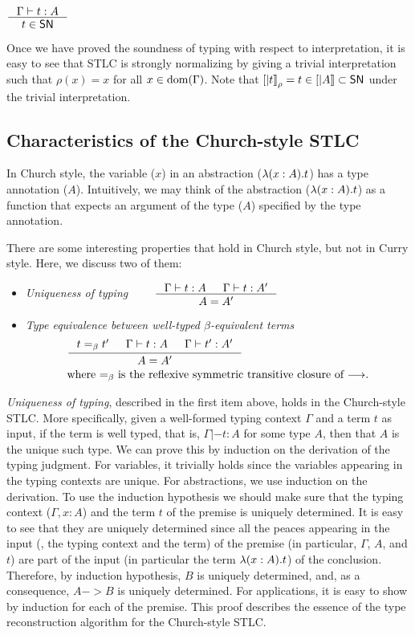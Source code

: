 \begin{corollary}
	$\inference{\Gamma |- t : A}{t \in \SN}$
\end{corollary}
Once we have proved the soundness of typing with respect to interpretation,
it is easy to see that STLC is strongly normalizing by giving a trivial
interpretation such that $\rho(x) = x$ for all $x\in\mathop{\mathrm{dom}}(\Gamma)$. Note that
$[|t|]_\rho = t \in [|A|] \subset \mathsf{SN}$ under the trivial interpretation.



\subsection{Characteristics of the Church-style STLC}\label{sec:stlc:church}
In Church style, the variable ($x$) in an abstraction
($\lambda(x:A).t$) has a type annotation ($A$). Intuitively, we may think of
the abstraction ($\lambda(x:A).t$) as a function that expects an argument of
the type ($A$) specified by the type annotation.

There are some interesting properties that hold in Church style,
but not in Curry style. Here, we discuss two of them:
\begin{itemize}
\item \emph{Uniqueness of typing}
$\qquad\inference{\Gamma |- t : A & \Gamma |- t : A'}{A = A'} $

\item \emph{Type equivalence between well-typed $\beta$-equivalent terms}
\begin{align*}
& \inference{t =_{\beta} t' & \Gamma |- t : A & \Gamma |- t' : A'}{A = A'} \\
& \text{where $=_{\beta}$ is the reflexive symmetric transitive closure of $-->$.}
\end{align*}
\end{itemize}

\emph{Uniqueness of typing}, described in the first item above,
holds in the Church-style STLC.  More specifically, given
a well-formed typing context $\Gamma$ and a term $t$ as input,
if the term is well typed, that is, $\Gamma |- t : A$ for some type $A$,
then that $A$ is the unique such type. We can prove this by induction on
the derivation of the typing judgment.
For variables, it trivially holds since the variables appearing in
the typing contexts are unique.
For abstractions, we use induction on the derivation.
To use the induction hypothesis we should make sure that
the typing context ($\Gamma,x:A$) and the term $t$ of the premise
is uniquely determined. It is easy to see that they are uniquely determined
since all the peaces appearing in the input (\ie, the typing context and
the term) of the premise (in particular, $\Gamma$, $A$, and $t$) are
part of the input (in particular the term $\lambda(x:A).t$) of the conclusion.
Therefore, by induction hypothesis, $B$ is uniquely determined, and,
as a consequence, $A -> B$ is uniquely determined.
For applications, it is easy to show by induction for each of the premise.
This proof describes the essence of the type reconstruction algorithm for
the Church-style STLC.


